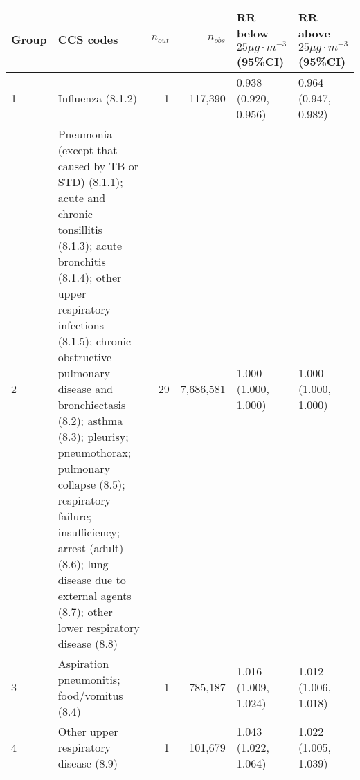 \begin{tabular}{lp{6.5cm}rrp{2.2cm}p{2.2cm}}
  \hline
Group & CCS codes & $n_{out}$ & $n_{obs}$ & RR below $25 \mu g \cdot m^{-3}$ (95\%CI) & RR above $25 \mu g \cdot m^{-3}$ (95\%CI) \\ 
  \hline
   1 & Influenza (8.1.2) &    1 & 117,390 & 0.938 (0.920, 0.956) & 0.964 (0.947, 0.982) \\ 
     2 & Pneumonia (except that caused by TB or STD) (8.1.1); acute and chronic tonsillitis (8.1.3); acute bronchitis (8.1.4); other upper respiratory infections (8.1.5); chronic obstructive pulmonary disease and bronchiectasis (8.2); asthma (8.3); pleurisy; pneumothorax; pulmonary collapse (8.5); respiratory failure; insufficiency; arrest (adult) (8.6); lung disease due to external agents (8.7); other lower respiratory disease (8.8) &   29 & 7,686,581 & 1.000 (1.000, 1.000) & 1.000 (1.000, 1.000) \\ 
     3 & Aspiration pneumonitis; food/vomitus (8.4) &    1 & 785,187 & 1.016 (1.009, 1.024) & 1.012 (1.006, 1.018) \\ 
     4 & Other upper respiratory disease (8.9) &    1 & 101,679 & 1.043 (1.022, 1.064) & 1.022 (1.005, 1.039) \\ 
   \hline
\end{tabular}

